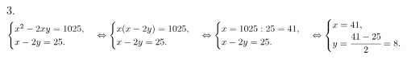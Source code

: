 3. $\begin{cases} x^2-2xy=1025,\\x-2y=25.\end{cases}\Leftrightarrow\begin{cases} x(x-2y)=1025,\\x-2y=25.\end{cases}
\Leftrightarrow\begin{cases} x=1025:25=41,\\x-2y=25.\end{cases}\Leftrightarrow\begin{cases} x=41,\\y=\cfrac{41-25}{2}=8.\end{cases}$\\
